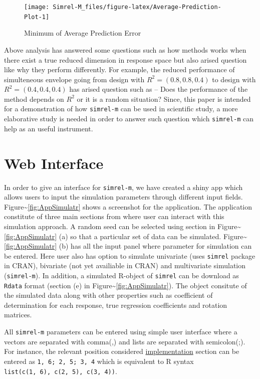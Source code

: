 \documentclass[12pt,A4paper,authoryear]{elsarticle} %
\theoremstyle{definition}
\theoremstyle{definition}
\theoremstyle{remark}
\begin{document}
\begin{figure}[H]
\texttt{[image: Simrel-M\_files/figure-latex/Average-Prediction-Plot-1]} \caption{Minimum of Average Prediction Error}\label{fig:Average-Prediction-Plot}
\end{figure}

Above analysis has answered some questions such as how methods works
when there exist a true reduced dimension in response space but also
arised question like why they perform differently. For example, the
reduced performance of simulteneous envelope going from design with
\(R^2 = (0.8, 0.8, 0.4)\) to design with \(R^2 = (0.4, 0.4, 0.4)\) has
arised question such as -- Does the performance of the method depends on
\(R^2\) or it is a random situation? Since, this paper is intended for a
demonstration of how \texttt{simrel-m} can be used in scientific study,
a more elaborative study is needed in order to answer such question
which \texttt{simrel-m} can help as an useful instrument.

\section{Web Interface}\label{web-interface}

In order to give an interface for \texttt{simrel-m}, we have created a
shiny app which allows users to input the simulation parameters through
different input fields. Figure\textasciitilde{}\ref{fig:AppSimulatr}
shows a screenshot for the application. The application constitute of
three main sections from where user can interact with this simulation
approach. A random seed can be selected using section in
Figure\textasciitilde{}\ref{fig:AppSimulatr} (a) so that a particular
set of data can be simulated.
Figure\textasciitilde{}\ref{fig:AppSimulatr} (b) has all the input panel
where parameter for simulation can be entered. Here user also has option
to simulate univariate (uses \texttt{simrel} package in CRAN), bivariate
(not yet availiable in CRAN) and multivariate simulation
(\texttt{simrel-m}). In addition, a simulated R-object of
\texttt{simrel} can be download as \texttt{Rdata} format (section (e) in
Figure\textasciitilde{}\ref{fig:AppSimulatr}). The object consitute of
the simulated data along with other properties such as coefficient of
determination for each response, true regression coefficients and
rotation matrices.

All \texttt{simrel-m} parameters can be entered using simple user
interface where a vectors are separated with comma(,) and lists are
separated with semicolon(;). For instance, the relevant position
considered \protect\hyperlink{implementation}{implementation} section
can be entered as \texttt{1,\ 6;\ 2,\ 5;\ 3,\ 4} which is equivalent to
R syntax \texttt{list(c(1,\ 6),\ c(2,\ 5),\ c(3,\ 4))}.
\end{document}
